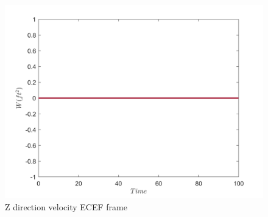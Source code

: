\begin{figure}[H]
	\caption{Z direction velocity ECEF frame}
	\centering
	\includegraphics[width=12cm]{Q1/figures/Z velocity.png}
\end{figure}